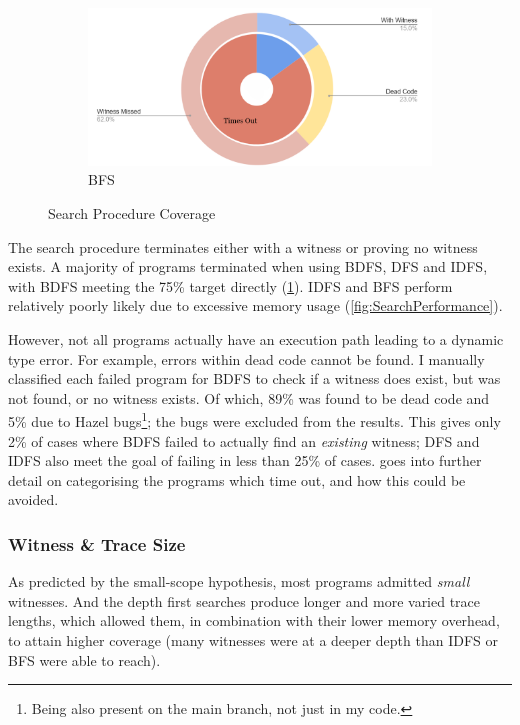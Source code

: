 \begin{figure}[h]
\begin{subfigure}{0.45\textwidth}
\includegraphics[width=\textwidth]{Media/Figures/BFS_coverage}
\caption{BFS}
\end{subfigure}

\caption{Search Procedure Coverage}
\label{fig:PieChart}
\end{figure}

The search procedure terminates either with a witness or proving no witness exists. A majority of programs terminated when using BDFS, DFS and IDFS, with BDFS meeting the 75\% target directly (\cref{fig:PieChart}). IDFS and BFS perform relatively poorly likely due to excessive memory usage (\cref{fig:SearchPerformance}). 

However, not all programs actually have an execution path leading to a dynamic type error. For example, errors within dead code cannot be found. I manually classified each failed program for BDFS to check if a witness does exist, but was not found, or no witness exists. Of which, 89\% was found to be dead code and 5\% due to Hazel bugs\footnote{Being also present on the main branch, not just in my code.}; the bugs were excluded from the results. This gives only 2\% of cases where BDFS failed to actually find an \textit{existing} witness; DFS and IDFS also meet the goal of failing in less than 25\% of cases.  goes into further detail on categorising the programs which time out, and how this could be avoided.

\subsubsection{Witness \& Trace Size}
As predicted by the small-scope hypothesis, most programs admitted \textit{small} witnesses. And the depth first searches produce longer and more varied trace lengths, which allowed them, in combination with their lower memory overhead, to attain higher coverage (many witnesses were at a deeper depth than IDFS or BFS were able to reach).

